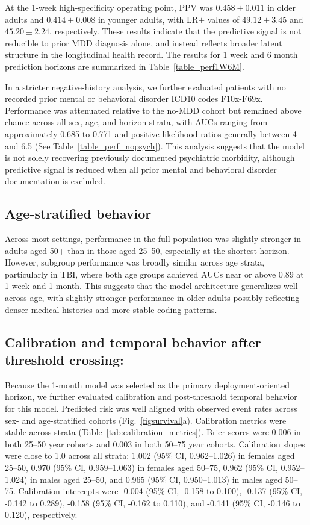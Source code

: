\documentclass[onecolumn, compsoc,11pt]{IEEEtran}
\begin{document}
At the 1-week high-specificity operating point, PPV was $0.458 \pm 0.011$ in older adults and $0.414 \pm 0.008$ in younger adults, with LR$+$ values of $49.12 \pm 3.45$ and $45.20 \pm 2.24$, respectively. These results indicate that the predictive signal is not reducible to prior MDD diagnosis alone, and instead reflects broader latent structure in the longitudinal health record.
The results for 1 week and 6 month prediction horizons are summarized in Table~\ref{table_perf1W6M}.


In a stricter negative-history analysis, we further evaluated patients with no recorded prior mental or behavioral disorder ICD10 codes F10x-F69x. Performance was attenuated relative to the no-MDD cohort but remained above chance across all sex, age, and horizon strata, with AUCs ranging from approximately 0.685 to 0.771 and positive likelihood ratios generally between 4 and 6.5 (See Table~\ref{table_perf_nopsych}). This analysis suggests that the model is not solely recovering previously documented psychiatric morbidity, although predictive signal is reduced when all prior mental and behavioral disorder documentation is excluded.

\subsection*{Age-stratified behavior}

Across most settings, performance in the full population was slightly stronger in adults aged 50+ than in those aged 25--50, especially at the shortest horizon. However, subgroup performance was broadly similar across age strata, particularly in TBI, where both age groups achieved AUCs near or above 0.89 at 1 week and 1 month. This suggests that the model architecture generalizes well across age, with slightly stronger performance in older adults possibly reflecting denser medical histories and more stable coding patterns.

\subsection*{Calibration and temporal behavior after threshold crossing:}
Because the 1-month model was selected as the primary deployment-oriented horizon, we further evaluated calibration and post-threshold temporal behavior for this model. Predicted risk was well aligned with observed event rates across sex- and age-stratified cohorts (Fig.~\ref{figsurvival}a). Calibration metrics were stable across strata (Table~\ref{tab:calibration_metrics}). Brier scores were 0.006 in both 25--50 year cohorts and 0.003 in both 50--75 year cohorts. Calibration slopes were close to 1.0 across all strata: 1.002 (95\% CI, 0.962--1.026) in females aged 25--50, 0.970 (95\% CI, 0.959--1.063) in females aged 50--75, 0.962 (95\% CI, 0.952--1.024) in males aged 25--50, and 0.965 (95\% CI, 0.950--1.013) in males aged 50--75. Calibration intercepts were -0.004 (95\% CI, -0.158 to 0.100), -0.137 (95\% CI, -0.142 to 0.289), -0.158 (95\% CI, -0.162 to 0.110), and -0.141 (95\% CI, -0.146 to 0.120), respectively.
\end{document}
